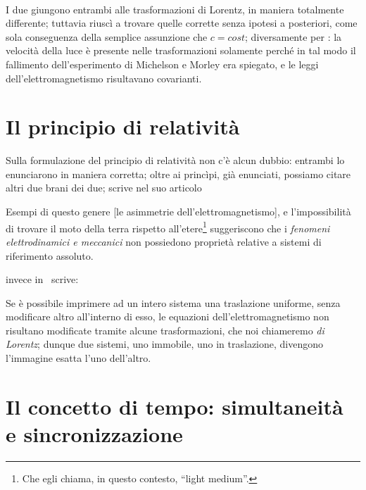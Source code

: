 \paragraph{}
I due giungono entrambi alle trasformazioni di Lorentz, in maniera
totalmente differente; \ein{} tuttavia riusc\`i a trovare quelle
corrette senza ipotesi a posteriori, come sola conseguenza della
semplice assunzione che $c = cost$; diversamente per
\poin: la velocit\`a della luce \`e presente nelle trasformazioni
solamente perch\'e in tal modo il fallimento dell'esperimento di
Michelson e Morley era spiegato, e le leggi dell'elettromagnetismo
risultavano covarianti.

\section{Il principio di relativit\`a} \label{relativita} Sulla
formulazione del principio di relativit\`a non c'\`e alcun dubbio:
entrambi lo enunciarono in maniera corretta; oltre
ai princ\`ipi, gi\`a enunciati, possiamo citare altri due brani dei due;
\ein{} scrive nel suo articolo
\begin{citaz}
  Esempi di questo genere [le asimmetrie dell'elettromagnetismo], e
  l'impossibilit\`a di trovare il moto della terra rispetto
  all'etere\footnote{Che egli chiama, in questo contesto, ``light
  medium''.} suggeriscono che i \emph{fenomeni elettrodinamici e
  meccanici} non possiedono propriet\`a relative a sistemi di
  riferimento assoluto.
\end{citaz}
\poin {} invece in~\cite{carro1} scrive:
\begin{citaz}
 Se \`e possibile imprimere ad un intero sistema una traslazione
 uniforme, senza modificare altro all'interno di esso, le equazioni
 dell'elettromagnetismo non risultano modificate tramite alcune
 trasformazioni, che noi chiameremo \emph{di Lorentz}; dunque due
 sistemi, uno immobile, uno in traslazione, divengono l'immagine esatta
 l'uno dell'altro. 
\end{citaz}

\section[Il concetto di tempo]{Il concetto di tempo: simultaneit\`a e
  sincronizzazione}

